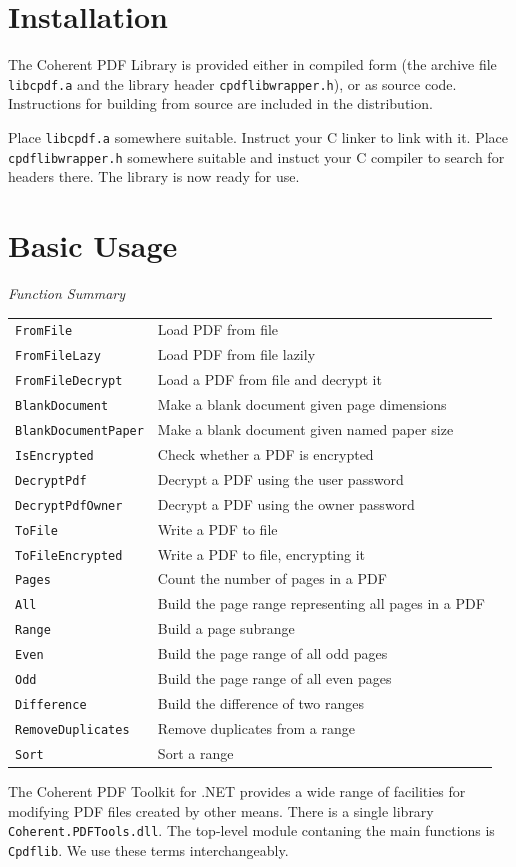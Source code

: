 \documentclass[a4paper]{memoir}
\begin{document}
\chapter*{Installation}
The Coherent PDF Library is provided either in compiled form (the archive file \texttt{libcpdf.a} and the library header \texttt{cpdflibwrapper.h}), or as source code. Instructions for building from source are included in the distribution.

Place \texttt{libcpdf.a} somewhere suitable. Instruct your C linker to link with it. Place \texttt{cpdflibwrapper.h} somewhere suitable and instuct your C compiler to search for headers there. \noindent The library is now ready for use.

\chapter{Basic Usage}
\begin{framed}
\noindent\textit{Function Summary}\\[2mm]
\noindent\begin{tabular}{ll}
\verb!FromFile! & Load PDF from file\\
\verb!FromFileLazy! & Load PDF from file lazily\\
\verb!FromFileDecrypt! & Load a PDF from file and decrypt it\\[5mm]
\verb!BlankDocument! & Make a blank document given page dimensions\\
\verb!BlankDocumentPaper! & Make a blank document given named paper size\\[5mm]
\verb!IsEncrypted! & Check whether a PDF is encrypted\\
\verb!DecryptPdf! & Decrypt a PDF using the user password\\
\verb!DecryptPdfOwner! & Decrypt a PDF using the owner password\\[5mm]
\verb!ToFile! & Write a PDF to file\\
\verb!ToFileEncrypted! & Write a PDF to file, encrypting it\\[5mm]
\verb!Pages! & Count the number of pages in a PDF\\[5mm]
\verb!All! & Build the page range representing all pages in a PDF\\
\verb!Range! & Build a page subrange\\
\verb!Even! & Build the page range of all odd pages\\
\verb!Odd! & Build the page range of all even pages\\
\verb!Difference! & Build the difference of two ranges\\
\verb!RemoveDuplicates! & Remove duplicates from a range\\
\verb!Sort! & Sort a range
\end{tabular}
\end{framed}
The Coherent PDF Toolkit for .NET provides a wide range of facilities for
modifying PDF files created by other means. There is a single library
\texttt{Coherent.PDFTools.dll}. The top-level module contaning the main functions is \texttt{Cpdflib}. We use these terms interchangeably.
\end{document}
